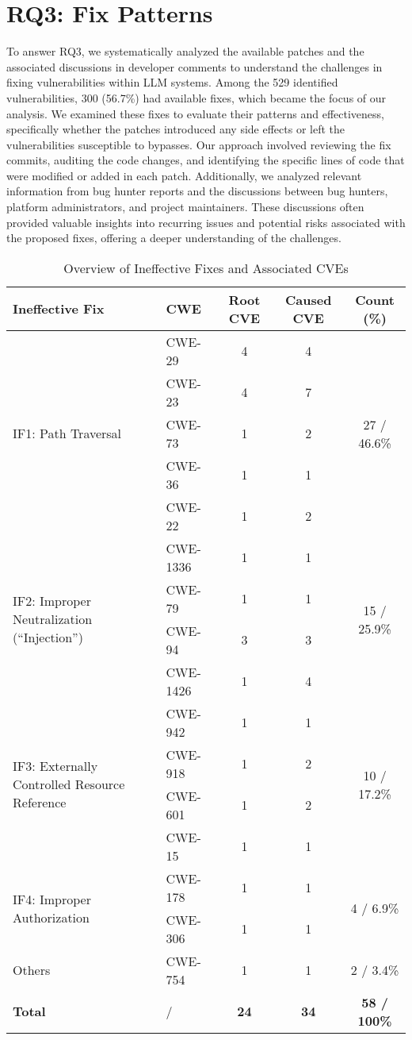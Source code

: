 \section{RQ3: Fix Patterns}
To answer RQ3, we systematically analyzed the available patches and the associated discussions in developer comments to understand the challenges in fixing vulnerabilities within LLM systems. Among the 529 identified vulnerabilities, 300 (56.7\%) had available fixes, which became the focus of our analysis. We examined these fixes to evaluate their patterns and effectiveness, specifically whether the patches introduced any side effects or left the vulnerabilities susceptible to bypasses. Our approach involved reviewing the fix commits, auditing the code changes, and identifying the specific lines of code that were modified or added in each patch. Additionally, we analyzed relevant information from bug hunter reports and the discussions between bug hunters, platform administrators, and project maintainers. These discussions often provided valuable insights into recurring issues and potential risks associated with the proposed fixes, offering a deeper understanding of the challenges.

\begin{table*}[t]
\centering
\caption{Overview of Ineffective Fixes and Associated CVEs}
\begin{tabular}{llccc}
\toprule
\textbf{Ineffective Fix} & \textbf{CWE} & \textbf{Root CVE} & \textbf{Caused CVE} & \textbf{Count (\%)} \\ 
\midrule
\multirow{5}{*}{IF1: Path Traversal} 
& CWE-29  & 4 & 4 & \multirow{5}{*}{27 / 46.6\%} \\
& CWE-23  & 4 & 7 &  \\
& CWE-73  & 1 & 2 &  \\
& CWE-36  & 1 & 1 &  \\
& CWE-22  & 1 & 2 &  \\
\midrule
\multirow{4}{*}{IF2: Improper Neutralization (``Injection'')} 
& CWE-1336 & 1 & 1 & \multirow{4}{*}{15 / 25.9\%} \\
& CWE-79  & 1 & 1 &  \\
& CWE-94  & 3 & 3 &  \\
& CWE-1426 & 1 & 4 &  \\
\midrule
\multirow{4}{*}{IF3: Externally Controlled Resource Reference} 
& CWE-942 & 1 & 1 & \multirow{4}{*}{10 / 17.2\%} \\
& CWE-918 & 1 & 2 &  \\
& CWE-601 & 1 & 2 &  \\
& CWE-15  & 1 & 1 &  \\
\midrule
\multirow{2}{*}{IF4: Improper Authorization}
& CWE-178 & 1 & 1 & \multirow{2}{*}{4 / 6.9\%} \\
& CWE-306 & 1 & 1 &  \\
\midrule
\multirow{1}{*}{Others} 
& CWE-754 & 1 & 1 & 2 / 3.4\% \\
\midrule
\textbf{Total} & / & \textbf{24} & \textbf{34} & \textbf{58 / 100\%} \\
\bottomrule
\end{tabular}
\label{table:ineffective_fixes}
\end{table*}

